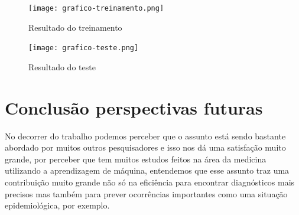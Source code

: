 \documentclass[conference]{IEEEtran}
\begin{document}
	 
    \begin{figure}[htbp]
	\centerline{\texttt{[image: grafico-treinamento.png]}}
	\caption{Resultado do treinamento}
	
	\label{fig}
	\end{figure}
	
    \begin{figure}[htbp]
	\centerline{\texttt{[image: grafico-teste.png]}}
	\caption{Resultado do teste}
	
	\label{fig}
	\end{figure}
	    
    
\section*{Conclusão perspectivas futuras}

  No decorrer do trabalho podemos perceber que o assunto está sendo bastante abordado por muitos outros pesquisadores e isso nos dá uma satisfação muito grande, por perceber que tem muitos estudos feitos na área da medicina utilizando a aprendizagem de máquina, entendemos que esse assunto traz uma contribuição muito grande não só na eficiência para encontrar diagnósticos mais precisos mas também para prever ocorrências importantes como uma situação epidemiológica, por exemplo.    
\end{document}
